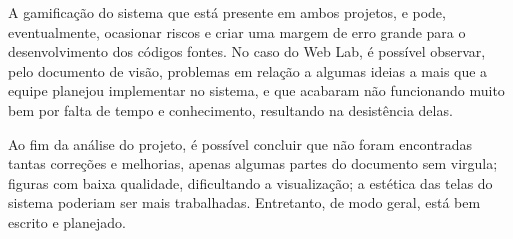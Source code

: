 A \gls{gamificação} do sistema que está presente em ambos projetos, e pode, eventualmente, ocasionar riscos e criar uma margem de erro grande para o desenvolvimento dos códigos fontes. No caso do Web Lab, é possível observar, pelo documento de visão, problemas em relação a algumas ideias a mais que a equipe planejou implementar no sistema, e que acabaram não funcionando muito bem por falta de tempo e conhecimento, resultando na desistência delas. 

Ao fim da análise do projeto, é possível concluir que não foram encontradas tantas correções e melhorias, apenas algumas partes do documento sem virgula; figuras com baixa qualidade, dificultando a visualização; a estética das telas do sistema poderiam ser mais trabalhadas. Entretanto, de modo geral, está bem escrito e planejado.